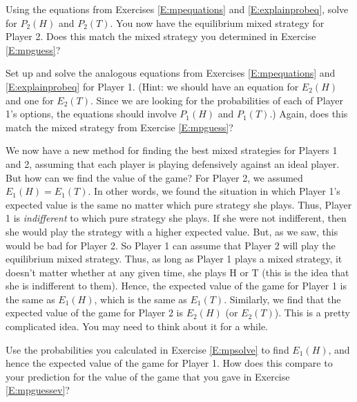 \begin{xca}\label{E:mpsolve}
Using the equations from Exercises \ref{E:mpequations} and \ref{E:explainprobeq}, solve for $P_2(H)$ and $P_2(T)$. You now have the equilibrium mixed strategy for Player 2. Does this match the mixed strategy you determined in Exercise \ref{E:mpguess}?
\end{xca}

\begin{xca}\label{E:mpP1sol}
Set up and solve the analogous equations from Exercises \ref{E:mpequations} and \ref{E:explainprobeq} for Player 1. (Hint: we should have an equation for $E_2(H)$ and one for $E_2(T)$. Since we are looking for the probabilities of each of Player 1's options, the equations should involve $P_1(H)$ and $P_1(T)$.) Again, does this match the mixed strategy from Exercise \ref{E:mpguess}? 
\end{xca}


We now have a new method for finding the best mixed strategies for Players 1 and 2, assuming that each player is playing defensively against an ideal player. But how can we find the value of the game?  For Player 2, we assumed $E_1(H)=E_1(T)$. In other words, we found the situation in which Player 1's expected value is the same no matter which pure strategy she plays. Thus, Player 1 is \emph{indifferent} to which pure strategy she plays. If she were not indifferent, then she would play the strategy with a higher expected value. But, as we saw, this would be bad for Player 2. So Player 1 can assume that Player 2 will play the equilibrium mixed strategy. Thus, as long as Player 1 plays a mixed strategy, it doesn't matter whether at any given time, she plays H or T (this is the idea that she is indifferent to them). Hence, the expected value of the game for Player 1 is the same as $E_1(H)$, which is the same as $E_1(T)$. Similarly, we find that the expected value of the game for Player 2 is $E_2(H)$ (or $E_2(T)$). This is a pretty complicated idea. You may need to think about it for a while.


 
\begin{xca}\label{E:mpEVP1}
Use the probabilities you calculated  in Exercise \ref{E:mpsolve} to find $E_1(H)$, and hence the expected value of the game for Player 1. How does this compare to your prediction for the value of the game that you gave in Exercise \ref{E:mpguessev}?
\end{xca}


